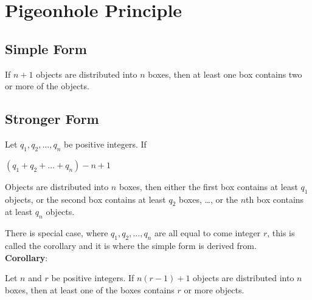 \documentclass[12pt, letterpaper]{article}
\begin{document}
 
\maketitle

\section*{Pigeonhole Principle}

\subsection*{Simple Form}

If \(n+ 1\) objects are distributed into \(n\) boxes, then at least one box contains two or more of the objects. 

\subsection*{Stronger Form}

Let \(q_1,q_2, \dots, q_n\) be positive integers. If
  \begin{center}
    \((q_1 + q_2+ \dots + q_n) - n + 1\)
  \end{center}
Objects are distributed into \(n\) boxes, then either the first box contains at least \(q_1\) objects, or the second box contains at least \(q_2\) boxes, \dots, or the \(n\)th box contains at least \(q_n\) objects. \indent

\noindent There is special case, where \(q_1, q_2, \dots, q_n\) are all equal to come integer \(r\), this is called the corollary and it is where the simple form is derived from. \\

\noindent \textbf{Corollary}:

\begin{center}
  Let \(n\) and \(r\) be positive integers. If \(n(r-1) + 1\) objects are distributed into \(n\) boxes, then at least one of the boxes contains \(r\) or more objects. 
\end{center}
\end{document}
